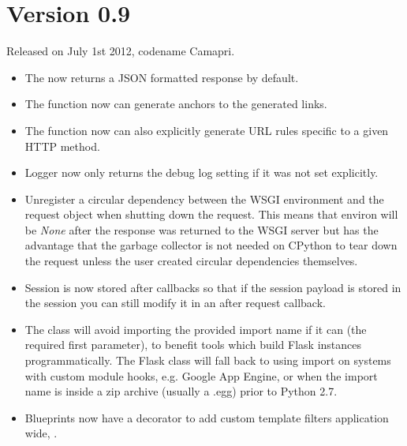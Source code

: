 \documentclass[a4paper,12pt]{sphinxmanual}
\begin{document}
\section{Version 0.9}
\label{changelog:version-0-9}
Released on July 1st 2012, codename Camapri.
\begin{itemize}
\item {} 
The {\hyperref[api:flask.Request.on_json_loading_failed]{}} now returns a JSON formatted
response by default.

\item {} 
The {\hyperref[api:flask.url_for]{}} function now can generate anchors to the
generated links.

\item {} 
The {\hyperref[api:flask.url_for]{}} function now can also explicitly generate
URL rules specific to a given HTTP method.

\item {} 
Logger now only returns the debug log setting if it was not set
explicitly.

\item {} 
Unregister a circular dependency between the WSGI environment and
the request object when shutting down the request.  This means that
environ  will be \emph{None} after the response was
returned to the WSGI server but has the advantage that the garbage
collector is not needed on CPython to tear down the request unless
the user created circular dependencies themselves.

\item {} 
Session is now stored after callbacks so that if the session payload
is stored in the session you can still modify it in an after
request callback.

\item {} 
The {\hyperref[api:flask.Flask]{}} class will avoid importing the provided import name
if it can (the required first parameter), to benefit tools which build Flask
instances programmatically.  The Flask class will fall back to using import
on systems with custom module hooks, e.g. Google App Engine, or when the
import name is inside a zip archive (usually a .egg) prior to Python 2.7.

\item {} 
Blueprints now have a decorator to add custom template filters application
wide, {\hyperref[api:flask.Blueprint.app_template_filter]{}}.


\end{itemize}
\end{document}
